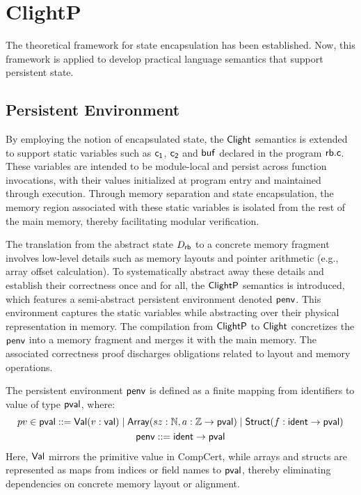 \section{ClightP}
\label{sec:oe:clightp}

The theoretical framework for state encapsulation
has been established.
Now, this framework is applied
to develop practical language semantics
that support persistent state.

\subsection{Persistent Environment}

By employing the notion of encapsulated state,
the $ \mathsf{Clight} $ semantics is extended
to support static variables
such as $ \mathsf{c_1} $, $ \mathsf{c_2} $ and $ \mathsf{buf} $
declared in the program $ \mathsf{rb.c} $.
These variables
are intended to be module-local
and persist across function invocations,
with their values initialized at program entry
and maintained through execution.
Through memory separation and state encapsulation,
the memory region
associated with these static variables
is isolated from the rest of the main memory,
thereby facilitating modular verification.

The translation from the abstract state $D_{ \mathsf{rb} }$
to a concrete memory fragment
involves low-level details
such as memory layouts and pointer arithmetic (e.g., array offset calculation).
To systematically abstract away these details
and establish their correctness once and for all,
the $ \mathsf{ClightP} $ semantics is introduced,
which features a semi-abstract persistent environment
denoted $ \mathsf{penv} $.
This environment captures the static variables
while abstracting over their physical representation in memory.
The compilation from $ \mathsf{ClightP} $ to $ \mathsf{Clight} $
concretizes the $ \mathsf{penv} $ into a memory fragment
and merges it with the main memory.
The associated correctness proof
discharges obligations related to layout and memory operations.

The persistent environment $ \mathsf{penv} $
is defined as a finite mapping from identifiers to
value of type $ \mathsf{pval} $,
where:
\begin{gather*}
  pv \in  \mathsf{pval}  \mathrel{::=}  \mathsf{Val} (v: \mathsf{val} )
  \mathrel{|}  \mathsf{Array} (sz:\mathbb{N},a:\mathbb{Z} \rightarrow  \mathsf{pval} )
  \mathrel{|}  \mathsf{Struct} (f: \mathsf{ident}  \rightarrow  \mathsf{pval} )
  \\
   \mathsf{penv}  \mathrel{::=}  \mathsf{ident}  \rightarrow  \mathsf{pval} 
\end{gather*}
Here, $ \mathsf{Val} $ mirrors the primitive value in CompCert,
while
arrays and structs are represented as
maps from indices or field names to $ \mathsf{pval} $,
thereby eliminating dependencies on concrete memory layout or alignment.

